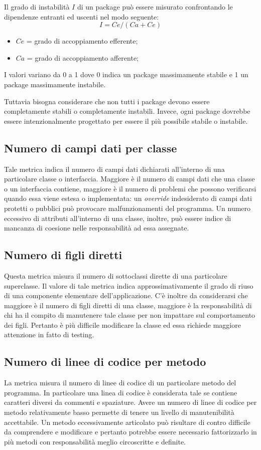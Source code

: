 Il grado di instabilità $I$ di un package può essere misurato confrontando le dipendenze entranti ed uscenti nel modo seguente:	
\begin{equation}
	I = Ce/(Ca + Ce) 
\end{equation}
\begin{itemize}
	\item $Ce$ = grado di accoppiamento efferente;
	\item $Ca$ = grado di accoppiamento afferente;
\end{itemize}
I valori variano da 0 a 1 dove 0 indica un package massimamente stabile e 1 un package massimamente instabile.

Tuttavia bisogna considerare che non tutti i package devono essere completamente stabili o completamente instabili. Invece, ogni package dovrebbe essere intenzionalmente progettato per essere il più possibile stabile o instabile.
	

\subsection{Numero di campi dati per classe}
Tale metrica indica il numero di campi dati dichiarati all'interno di una particolare classe o interfaccia. Maggiore è il numero di campi dati che una classe o un interfaccia contiene, maggiore è il numero di problemi che possono verificarsi quando essa viene estesa o implementata: un \emph{override} indesiderato di campi dati protetti o pubblici può provocare malfunzionamenti del programma. Un numero eccessivo di attributi all'interno di una classe, inoltre, può essere indice di mancanza di coesione nelle responsabilità ad essa assegnate.


\subsection{Numero di figli diretti}
Questa metrica misura il numero di sottoclassi dirette di una particolare superclasse. Il valore di tale metrica indica approssimativamente il grado di riuso di una componente elementare dell'applicazione. C'è inoltre da considerarsi che maggiore è il numero di figli diretti di una classe, maggiore è la responsabilità di chi ha il compito di manutenere tale classe per non impattare sul comportamento dei figli. Pertanto è più difficile modificare la classe ed essa richiede maggiore attenzione in fatto di testing.


\subsection{Numero di linee di codice per metodo}
La metrica misura il numero di linee di codice di un particolare metodo del programma. In particolare una linea di codice è considerata tale se contiene caratteri diversi da commenti e spaziature. Avere un numero di linee di codice per metodo relativamente basso permette di tenere un livello di manutenibilità accettabile. Un metodo eccessivamente articolato può risultare di contro difficile da comprendere e modificare e pertanto potrebbe essere necessario fattorizzarlo in più metodi con responsabilità meglio circoscritte e definite.


